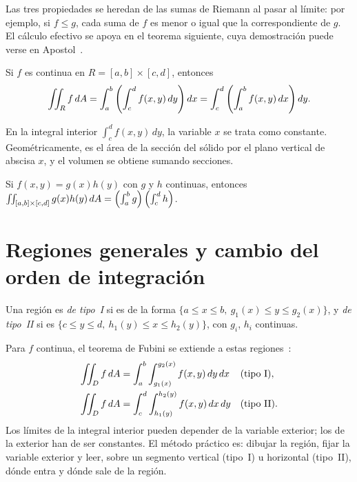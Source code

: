 Las tres propiedades se heredan de las sumas de Riemann al pasar al límite: por ejemplo, si $f\le g$, cada suma de $f$ es menor o igual que la correspondiente de $g$. El cálculo efectivo se apoya en el teorema siguiente, cuya demostración puede verse en Apostol~\cite[§11.10--11.11]{apostol2}.

\begin{teorema}\label{teo:fubini}
Si $f$ es continua en $R=[a,b]\times[c,d]$, entonces
\[
\iint_R f\,dA=\int_a^b\left(\int_c^d f(x,y)\,dy\right)dx=\int_c^d\left(\int_a^b f(x,y)\,dx\right)dy .
\]
\end{teorema}

En la integral interior $\int_c^df(x,y)\,dy$, la variable $x$ se trata como constante. Geométricamente, es el área de la sección del sólido por el plano vertical de abscisa $x$, y el volumen se obtiene sumando secciones.

\begin{corolario}\label{cor:separable}
Si $f(x,y)=g(x)h(y)$ con $g$ y $h$ continuas, entonces $\iint_{[a,b]\times[c,d]}g(x)h(y)\,dA=\left(\int_a^bg\right)\left(\int_c^dh\right)$.
\end{corolario}

\addtocounter{definicion}{1}%

\section{Regiones generales y cambio del orden de integración}

\begin{definicion}\label{def:regiones}
Una región es \emph{de tipo~I} si es de la forma $\{a\le x\le b,\ g_1(x)\le y\le g_2(x)\}$, y \emph{de tipo~II} si es $\{c\le y\le d,\ h_1(y)\le x\le h_2(y)\}$, con $g_i$, $h_i$ continuas.
\end{definicion}

Para $f$ continua, el teorema de Fubini se extiende a estas regiones~\cite[§11.12--11.14]{apostol2}:
\begin{align*}
\iint_Df\,dA&=\int_a^b\int_{g_1(x)}^{g_2(x)}f(x,y)\,dy\,dx&&\text{(tipo I)},\\
\iint_Df\,dA&=\int_c^d\int_{h_1(y)}^{h_2(y)}f(x,y)\,dx\,dy&&\text{(tipo II)}.
\end{align*}
Los límites de la integral interior pueden depender de la variable exterior; los de la exterior han de ser constantes. El método práctico es: dibujar la región, fijar la variable exterior y leer, sobre un segmento vertical (tipo~I) u horizontal (tipo~II), dónde entra y dónde sale de la región.

